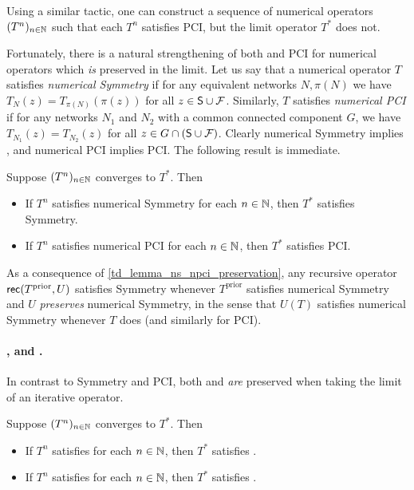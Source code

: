 Using a similar tactic, one can construct a sequence of numerical operators
$(T^n)_{n \in \mathbb{N}}$ such that each $T^n$ satisfies PCI, but the limit operator
$T^*$ does not.

Fortunately, there is a natural strengthening of both \symmetry{} and PCI for
numerical operators which \emph{is} preserved in the limit. Let us say that a
numerical operator $T$ satisfies \emph{numerical Symmetry} if for any
equivalent networks $N, \pi(N)$ we have $T_N(z) = T_{\pi(N)}(\pi(z))$ for all
$z \in \mathsf{S} \cup \mathcal{F}$. Similarly, $T$ satisfies \emph{numerical PCI} if for any
networks $N_1$ and $N_2$ with a common connected component $G$, we have
$T_{N_1}(z) = T_{N_2}(z)$ for all $z \in G \cap (\mathsf{S} \cup \mathcal{F})$. Clearly
numerical Symmetry implies \symmetry{}, and numerical PCI implies PCI. The
following result is immediate.

\begin{lemma}
    \label{td_lemma_ns_npci_preservation}
    Suppose $(T^n)_{n \in \mathbb{N}}$ converges to $T^*$. Then
    \begin{itemize}
        \item If $T^n$ satisfies numerical Symmetry for each $n \in \mathbb{N}$, then
              $T^*$ satisfies Symmetry.
        \item If $T^n$ satisfies numerical PCI for each $n \in \mathbb{N}$, then
              $T^*$ satisfies PCI.
    \end{itemize}
\end{lemma}

As a consequence of \cref{td_lemma_ns_npci_preservation}, any recursive
operator $\mathsf{rec}(T^\text{prior}, U)$ satisfies Symmetry whenever
$T^{\text{prior}}$ satisfies numerical Symmetry and $U$ \emph{preserves}
numerical Symmetry, in the sense that $U(T)$ satisfies numerical Symmetry
whenever $T$ does (and similarly for PCI).

\paragraph{\unanimity{}, \groundedness{} and \monotonicity{}.} In contrast to Symmetry
and PCI, both \unanimity{} and \groundedness{} \emph{are} preserved when taking the
limit of an iterative operator.

\begin{lemma}
    \label{td_lemma_unam_groundedness_preservation}
    Suppose $(T^n)_{n \in \mathbb{N}}$ converges to $T^*$. Then

    \begin{itemize}
        \item If $T^n$ satisfies \unanimity{} for each $n \in \mathbb{N}$, then $T^*$
            satisfies \unanimity{}.
          \item If $T^n$ satisfies \groundedness{} for each $n \in \mathbb{N}$, then $T^*$
              satisfies \groundedness{}.
    \end{itemize}
\end{lemma}

